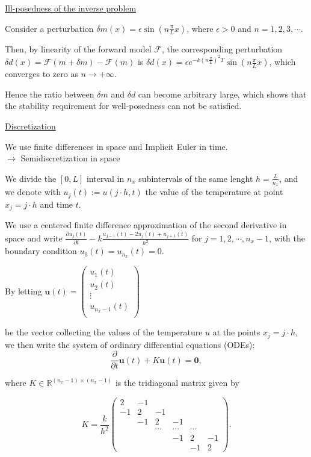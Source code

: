 \documentclass{beamer}
\begin{document}
\begin{frame}
{\color{red} \underline{Ill-posedness of the inverse problem}}

Consider a perturbation $\delta m(x)=\epsilon \sin(n\frac{\pi}{L}x)$, where $\epsilon>0$ and $n=1,2,3, \cdots$.

Then, by linearity of the forward model $\mathcal{F}$, the corresponding perturbation $\delta d(x)=\mathcal{F}(m+\delta m) - \mathcal{F}(m)$ is $\delta d(x)=\epsilon e^{-k(n\frac{\pi}{L})^2T} \sin(n\frac{\pi}{L}x)$, which converges to zero as $n \longrightarrow + \infty$.

Hence the ratio between $\delta m$ and $\delta d$ can become arbitrary large, which shows that the stability requirement for well-posedness can not be satisfied. \\
\end{frame}

\begin{frame}
{\color{red} \underline{Discretization}}

We use finite differences in space and Implicit Euler in time. \\

{\color{red} $\longrightarrow$ Semidiscretization in space }

We divide the $[0,L]$ interval in $n_x$ subintervals of the same lenght $h=\frac{L}{n_x}$, and we denote with $u_j(t):=u(j \cdot h,t)$ the value of the temperature at point $x_j=j \cdot h$ and time $t$.

We use a centered finite difference approximation of the second derivative in space and write
$\frac{\partial u_{j} (t)}{\partial t } -  k \frac{u_{j-1} (t) - 2 u_{j} (t)+ u_{j+1} (t)}{h^2}$ for $ j=1,2, \cdots , n_{x}-1$, with the boundary condition $u_0 (t)=u_{n_x}(t)=0$.
\end{frame}

\begin{frame}
By letting $\mathbf{u}(t)= \begin{pmatrix}
u_1(t) \\
u_2(t) \\
\vdots \\
u_{n_x-1}(t)\\
\end{pmatrix}$

be the vector collecting the values of the temperature $u$ at the points $x_j=j \cdot h$, we then write the system of ordinary differential equations (ODEs):
$$\frac{\partial}{\partial t}\mathbf{u}(t)+K \mathbf{u}(t)=\mathbf{0},$$

where $K \in \mathbb{R}^{(n_x - 1)\times(n_x - 1)}$ is the tridiagonal matrix given by

$$K=\frac{k}{h^2} \begin{pmatrix}
2 & -1 & & & &  \\
-1 & 2 & -1 & & & \\
 & -1 & 2 & -1 & & \\
 & & \cdots & \cdots & \cdots & \\
 & & & -1 & 2 & -1\\
 & & & & -1 & 2
\end{pmatrix}.$$
\end{frame}
\end{document}
